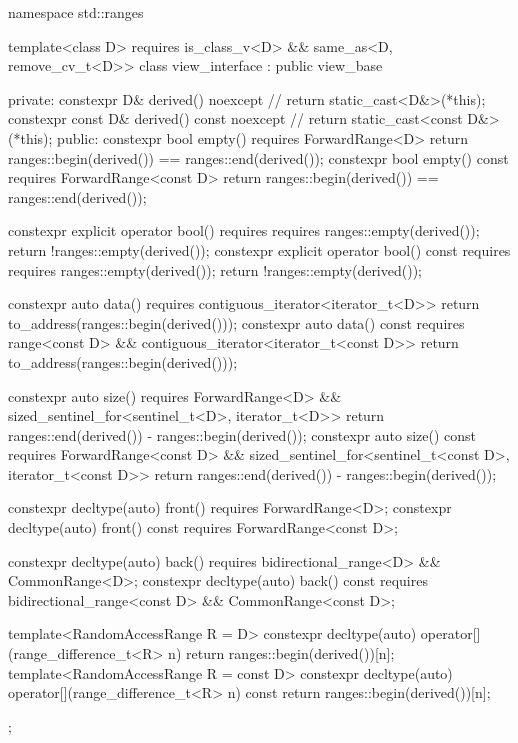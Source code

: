 %
\begin{codeblock}
namespace std::ranges {
  template<class D>
    requires is_class_v<D> && same_as<D, remove_cv_t<D>>
  class view_interface : public view_base {
  private:
    constexpr D& derived() noexcept {                   // \expos
      return static_cast<D&>(*this);
    }
    constexpr const D& derived() const noexcept {       // \expos
      return static_cast<const D&>(*this);
    }
  public:
    constexpr bool empty() requires ForwardRange<D> {
      return ranges::begin(derived()) == ranges::end(derived());
    }
    constexpr bool empty() const requires ForwardRange<const D> {
      return ranges::begin(derived()) == ranges::end(derived());
    }

    constexpr explicit operator bool()
      requires requires { ranges::empty(derived()); } {
        return !ranges::empty(derived());
      }
    constexpr explicit operator bool() const
      requires requires { ranges::empty(derived()); } {
        return !ranges::empty(derived());
      }

    constexpr auto data() requires contiguous_iterator<iterator_t<D>> {
      return to_address(ranges::begin(derived()));
    }
    constexpr auto data() const
      requires range<const D> && contiguous_iterator<iterator_t<const D>> {
        return to_address(ranges::begin(derived()));
      }

    constexpr auto size() requires ForwardRange<D> &&
      sized_sentinel_for<sentinel_t<D>, iterator_t<D>> {
        return ranges::end(derived()) - ranges::begin(derived());
      }
    constexpr auto size() const requires ForwardRange<const D> &&
      sized_sentinel_for<sentinel_t<const D>, iterator_t<const D>> {
        return ranges::end(derived()) - ranges::begin(derived());
      }

    constexpr decltype(auto) front() requires ForwardRange<D>;
    constexpr decltype(auto) front() const requires ForwardRange<const D>;

    constexpr decltype(auto) back() requires bidirectional_range<D> && CommonRange<D>;
    constexpr decltype(auto) back() const
      requires bidirectional_range<const D> && CommonRange<const D>;

    template<RandomAccessRange R = D>
      constexpr decltype(auto) operator[](range_difference_t<R> n) {
        return ranges::begin(derived())[n];
      }
    template<RandomAccessRange R = const D>
      constexpr decltype(auto) operator[](range_difference_t<R> n) const {
        return ranges::begin(derived())[n];
      }
  };
}
\end{codeblock}

